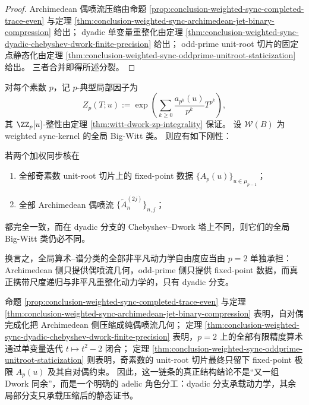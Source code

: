 \begin{proof}
Archimedean 偶喷流压缩由命题 \ref{prop:conclusion-weighted-sync-completed-trace-even} 与定理 \ref{thm:conclusion-weighted-sync-archimedean-jet-binary-compression} 给出；
dyadic 单变量重整化由定理 \ref{thm:conclusion-weighted-sync-dyadic-chebyshev-dwork-finite-precision} 给出；
odd-prime unit-root 切片的固定点静态化由定理 \ref{thm:conclusion-weighted-sync-oddprime-unitroot-staticization} 给出。
三者合并即得所述分裂。
\end{proof}

\begin{conjecture}\label{conj:conclusion-weighted-sync-dyadic-global-dominance}
对每个素数 \(p\)，记 \(p\)-典型局部因子为
\[
Z_p(T;u):=\exp\!\left(\sum_{k\ge 0}\frac{a_{p^k}(u)}{p^k}T^{p^k}\right),
\]
其 \(\ZZ_p[u]\)-整性由定理 \ref{thm:witt-dwork-zp-integrality} 保证。
设 \(\mathscr W(B)\) 为 weighted sync-kernel 的全局 Big-Witt 类。
则应有如下刚性：

若两个加权同步核在
\begin{enumerate}
  \item 全部奇素数 unit-root 切片上的 fixed-point 数据 \(\{A_p(u)\}_{u\in\mu_{p-1}}\)；
  \item 全部 Archimedean 偶喷流 \(\{\widetilde A_n^{(2j)}\}_{n,j}\)；
\end{enumerate}
都完全一致，而在 dyadic 分支的 Chebyshev--Dwork 塔上不同，则它们的全局 Big-Witt 类仍必不同。

换言之，全局算术--谱分类的全部非平凡动力学自由度应当由 \(p=2\) 单独承担：Archimedean 侧只提供偶喷流几何，odd-prime 侧只提供 fixed-point 数据，而真正携带尺度递归与非平凡重整化动力学的，只有 dyadic 分支。
\end{conjecture}

\begin{remark}[统一读法]\label{rem:conclusion-weighted-synckernel-selfdual-dyadic-unitroot-adelic-splitting}
命题 \ref{prop:conclusion-weighted-sync-completed-trace-even} 与定理 \ref{thm:conclusion-weighted-sync-archimedean-jet-binary-compression} 表明，自对偶完成化把 Archimedean 侧压缩成纯偶喷流几何；
定理 \ref{thm:conclusion-weighted-sync-dyadic-chebyshev-dwork-finite-precision} 表明，\(p=2\) 上的全部有限精度算术通过单变量迭代 \(t\mapsto t^2-2\) 闭合；
定理 \ref{thm:conclusion-weighted-sync-oddprime-unitroot-staticization} 则表明，奇素数的 unit-root 切片最终只留下 fixed-point 极限 \(A_p(u)\) 及其自对偶约束。
因此，这一链条的真正结构结论不是“又一组 Dwork 同余”，而是一个明确的 adelic 角色分工：dyadic 分支承载动力学，其余局部分支只承载压缩后的静态证书。
\end{remark}

\endinput
